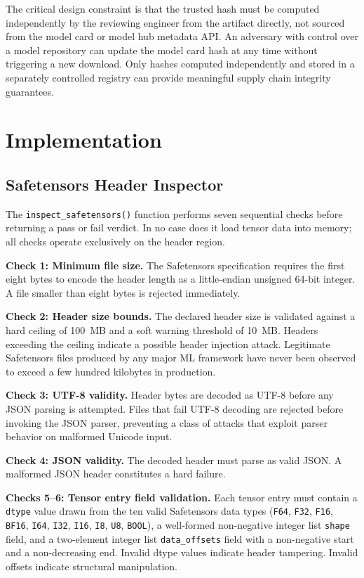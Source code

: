 \documentclass[preprint,12pt,twocolumn]{elsarticle}
\begin{document}
The critical design constraint is that the trusted hash must be computed
independently by the reviewing engineer from the artifact directly, not
sourced from the model card or model hub metadata API. An adversary with
control over a model repository can update the model card hash at any time
without triggering a new download. Only hashes computed independently and
stored in a separately controlled registry can provide meaningful supply
chain integrity guarantees.

\section{Implementation}
\label{sec:impl}

\subsection{Safetensors Header Inspector}

The \texttt{inspect\_safetensors()} function performs seven sequential
checks before returning a pass or fail verdict. In no case does it load
tensor data into memory; all checks operate exclusively on the header
region.

\textbf{Check 1: Minimum file size.} The Safetensors specification requires
the first eight bytes to encode the header length as a little-endian
unsigned 64-bit integer. A file smaller than eight bytes is rejected
immediately.

\textbf{Check 2: Header size bounds.} The declared header size is validated
against a hard ceiling of 100~MB and a soft warning threshold of 10~MB.
Headers exceeding the ceiling indicate a possible header injection attack.
Legitimate Safetensors files produced by any major ML framework have never
been observed to exceed a few hundred kilobytes in production.

\textbf{Check 3: UTF-8 validity.} Header bytes are decoded as UTF-8 before
any JSON parsing is attempted. Files that fail UTF-8 decoding are rejected
before invoking the JSON parser, preventing a class of attacks that exploit
parser behavior on malformed Unicode input.

\textbf{Check 4: JSON validity.} The decoded header must parse as valid
JSON. A malformed JSON header constitutes a hard failure.

\textbf{Checks 5--6: Tensor entry field validation.} Each tensor entry must
contain a \texttt{dtype} value drawn from the ten valid Safetensors data
types (\texttt{F64}, \texttt{F32}, \texttt{F16}, \texttt{BF16},
\texttt{I64}, \texttt{I32}, \texttt{I16}, \texttt{I8}, \texttt{U8},
\texttt{BOOL}), a well-formed non-negative integer list \texttt{shape}
field, and a two-element integer list \texttt{data\_offsets} field with a
non-negative start and a non-decreasing end. Invalid dtype values indicate
header tampering. Invalid offsets indicate structural manipulation.
\end{document}
